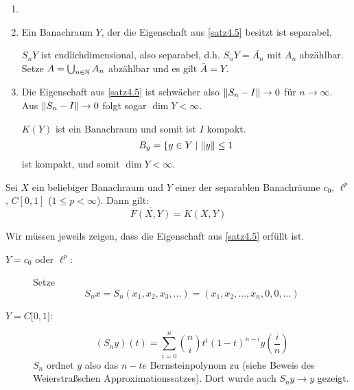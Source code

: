 \begin{bemerkung*}
	\begin{enumerate}
		\item[]
		\item Ein Banachraum $ Y $, der die Eigenschaft aus \ref{satz4.5} besitzt ist separabel.
		\begin{beweis}
			$ S_nY $ ist endlichdimensional, also separabel, d.h. $ S_nY=\bar{A_n} $ mit $ A_n $ abz\"ahlbar.\\
			Setze $ A=\bigcup_{n\in\mathbb{N}} A_n $ abz\"ahlbar und es gilt $ \bar A=Y $.
		\end{beweis}
		\item Die Eigenschaft aus \ref{satz4.5} ist schw\"acher also $ \left\|S_n-I\right\|\rightarrow 0 $ f\"ur $ n\rightarrow\infty $. Aus $ \left\|S_n-I\right\|\rightarrow 0 $ folgt sogar $ \dim Y<\infty $.
		\begin{beweis}
			$ K(Y) $ ist ein Banachraum und somit ist $ I $ kompakt. 
			\[ B_y=\lbrace y\in Y\mid \left\|y\right\|\leq 1 \]
			ist kompakt, und somit $ \dim Y<\infty $.
		\end{beweis}
	\end{enumerate}
\end{bemerkung*}
\begin{korollar}
	Sei $ X $ ein beliebiger Banachraum und $ Y $ einer der separablen Banachr\"aume $ c_0 $, $ \ell^p $, $ C[0,1] $ ($ 1\leq p<\infty $). Dann gilt:
	\[ \overline{F(X,Y)}=K(X,Y) \]
\end{korollar}
\begin{beweis}
	Wir m\"ussen jeweils zeigen, dass die Eigenschaft aus \ref{satz4.5} erf\"ullt ist.
	\begin{description}
		\item[$ Y=c_0 $ oder $ \ell^p $:] Setze 
		\[ S_nx=S_n(x_1,x_2,x_3,...)=(x_1,x_2,...,x_n,0,0,...) \]
		\item[$ Y=C[0,1\rbrack $:] 
		\[ (S_ny)(t)=\sum_{i=0}^{n}\binom{n}{i}t^i(1-t)^{n-i}y\left(\frac{i}{n}\right) \]
		$ S_n $ ordnet $ y $ also das $ n-te $ Bernsteinpolynom zu (siehe Beweis des Weierstra\ss schen Approximationssatzes). Dort wurde auch $ S_ny\rightarrow y $ gezeigt.
	\end{description}
\end{beweis}